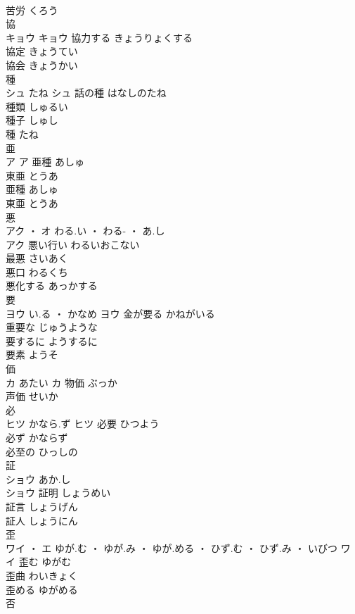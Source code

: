 \documentclass[8pt]{extreport}
\begin{document}
\begin{CJK}{UTF8}{min}
\\	苦労	くろう	
\\	協	
\\	キョウ		キョウ	協力する	きょうりょくする	
\\	協定	きょうてい	
\\	協会	きょうかい	
\\	種	
\\	シュ	たね	シュ	話の種	はなしのたね	
\\	種類	しゅるい	
\\	種子	しゅし	
\\	種	たね	
\\	亜	
\\	ア		ア	亜種	あしゅ	
\\	東亜	とうあ	
\\	亜種	あしゅ	
\\	東亜	とうあ	
\\	悪	
\\	アク ・ オ	わる.い ・ わる- ・ あ.し
\\	アク	悪い行い	わるいおこない	
\\	最悪	さいあく	
\\	悪口	わるくち	
\\	悪化する	あっかする	
\\	要	
\\	ヨウ	い.る ・ かなめ	ヨウ	金が要る	かねがいる	
\\	重要な	じゅうような	
\\	要するに	ようするに	
\\	要素	ようそ	
\\	価	
\\	カ	あたい	カ	物価	ぶっか	
\\	声価	せいか	
\\	必	
\\	ヒツ	かなら.ず	ヒツ	必要	ひつよう	
\\	必ず	かならず	
\\	必至の	ひっしの	
\\	証	
\\	ショウ	あか.し
\\	ショウ	証明	しょうめい	
\\	証言	しょうげん	
\\	証人	しょうにん	
\\	歪	
\\	ワイ ・ エ	ゆが.む ・ ゆが.み ・ ゆが.める ・ ひず.む ・ ひず.み ・ いびつ	ワイ	歪む	ゆがむ	
\\	歪曲	わいきょく	
\\	歪める	ゆがめる	
\\	否	

\end{CJK}
\end{document}
